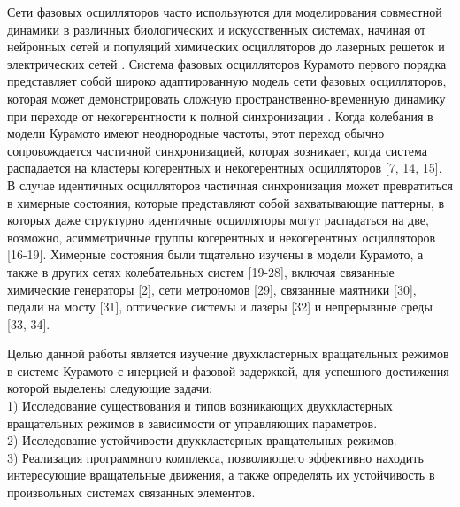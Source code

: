Сети фазовых осцилляторов часто используются для моделирования
совместной динамики в различных биологических и
искусственных системах, начиная от нейронных сетей \cite{Hoppensteadt:Izhikevich} и
популяций химических осцилляторов \cite{Tinsley:Nkomo} до лазерных решеток \cite{Ding:Belykh}
и электрических сетей \cite{Dorfler:Chertkov}. Система
фазовых осцилляторов Курамото первого порядка \cite{Kuramoto,Strogatz} представляет собой широко адаптированную модель
сети фазовых осцилляторов, которая может демонстрировать сложную
пространственно-временную динамику при переходе от
некогерентности к полной синхронизации \cite{Acebron:Bonilla,Barreto:Hunt,Ott:Antonsen,Hong:Chate,Pikovsky:Rosenblum,Maistrenko:Popovych,Dorfler:Bullo,Martens:Barreto}. Когда
колебания в модели Курамото имеют неоднородные частоты, этот переход обычно
сопровождается частичной синхронизацией, которая возникает, когда система
распадается на кластеры когерентных и некогерентных осцилляторов
[7, 14, 15]. В случае идентичных осцилляторов частичная
синхронизация может превратиться в химерные состояния,
которые представляют собой захватывающие паттерны, в которых даже
структурно идентичные осцилляторы могут распадаться на две, возможно,
асимметричные группы когерентных и некогерентных осцилляторов [16-19].
Химерные состояния были тщательно изучены в модели Курамото,
а также в других сетях колебательных систем [19-28], включая связанные химические генераторы [2], сети
метрономов [29], связанные маятники [30],
педали на мосту [31], оптические системы и лазеры [32]
и непрерывные среды [33, 34].

Целью данной работы является изучение двухкластерных вращательных режимов в системе Курамото
с инерцией и фазовой задержкой, для успешного достижения которой выделены следующие задачи: \\
1) Исследование существования и типов возникающих двухкластерных вращательных режимов в зависимости от управляющих параметров. \\
2) Исследование устойчивости двухкластерных вращательных режимов. \\
3) Реализация программного комплекса, позволяющего эффективно находить интересующие вращательные движения, а также определять
их устойчивость в произвольных системах связанных элементов.
